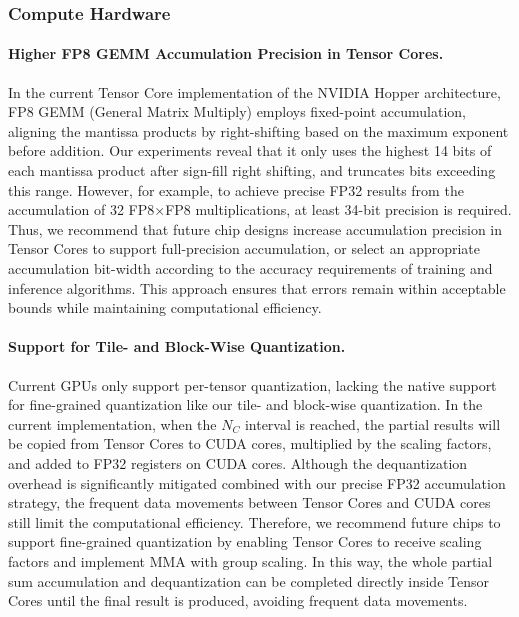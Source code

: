 \documentclass[11pt, a4paper, logo, copyright, nonumbering]{deepseek}
\begin{document}
\begin{CJK*}{UTF8}{gbsn}
\subsubsection{Compute Hardware}

\paragraph{Higher FP8 GEMM Accumulation Precision in Tensor Cores.}
In the current Tensor Core implementation of the NVIDIA Hopper architecture, FP8 GEMM (General Matrix Multiply) employs fixed-point accumulation, aligning the mantissa products by right-shifting based on the maximum exponent before addition. 
Our experiments reveal that it only uses the highest 14 bits of each mantissa product after sign-fill right shifting, and truncates bits exceeding this range. 
However, for example, to achieve precise FP32 results from the accumulation of 32 FP8$\times$FP8 multiplications, at least 34-bit precision is required. 
Thus, we recommend that future chip designs increase accumulation precision in Tensor Cores to support full-precision accumulation, or select an appropriate accumulation bit-width according to the accuracy requirements of training and inference algorithms. 
This approach ensures that errors remain within acceptable bounds while maintaining computational efficiency.

\paragraph{Support for Tile- and Block-Wise Quantization.}
Current GPUs only support per-tensor quantization, lacking the native support for fine-grained quantization like our tile- and block-wise quantization.
In the current implementation, when the $N_C$ interval is reached, the partial results will be copied from Tensor Cores to CUDA cores, multiplied by the scaling factors, and added to FP32 registers on CUDA cores.
Although the dequantization overhead is significantly mitigated combined with our precise FP32 accumulation strategy, the frequent data movements between Tensor Cores and CUDA cores still limit the computational efficiency. 
Therefore, we recommend future chips to support fine-grained quantization by enabling Tensor Cores to receive scaling factors and implement MMA with group scaling. 
In this way, the whole partial sum accumulation and dequantization can be completed directly inside Tensor Cores until the final result is produced, avoiding frequent data movements.


\end{CJK*}
\end{document}
